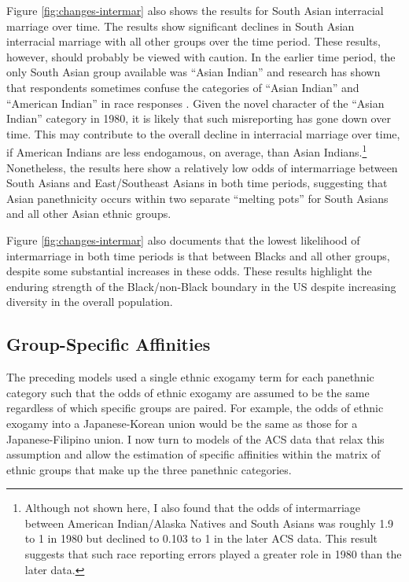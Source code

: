 \documentclass[11pt,]{article}
\begin{document}
Figure \ref{fig:changes-intermar} also shows the results for South Asian interracial marriage over time. The results show significant declines in South Asian interracial marriage with all other groups over the time period. These results, however, should probably be viewed with caution. In the earlier time period, the only South Asian group available was ``Asian Indian'' and research has shown that respondents sometimes confuse the categories of ``Asian Indian'' and ``American Indian'' in race responses \citep{liebler_american_2004}. Given the novel character of the ``Asian Indian'' category in 1980, it is likely that such misreporting has gone down over time. This may contribute to the overall decline in interracial marriage over time, if American Indians are less endogamous, on average, than Asian Indians.\footnote{Although not shown here, I also found that the odds of intermarriage between American Indian/Alaska Natives and South Asians was roughly 1.9 to 1 in 1980 but declined to 0.103 to 1 in the later ACS data. This result suggests that such race reporting errors played a greater role in 1980 than the later data.} Nonetheless, the results here show a relatively low odds of intermarriage between South Asians and East/Southeast Asians in both time periods, suggesting that Asian panethnicity occurs within two separate ``melting pots'' for South Asians and all other Asian ethnic groups.

Figure \ref{fig:changes-intermar} also documents that the lowest likelihood of intermarriage in both time periods is that between Blacks and all other groups, despite some substantial increases in these odds. These results highlight the enduring strength of the Black/non-Black boundary in the US despite increasing diversity in the overall population.

\hypertarget{group-specific-affinities}{%
\subsection{Group-Specific Affinities}\label{group-specific-affinities}}

The preceding models used a single ethnic exogamy term for each panethnic category such that the odds of ethnic exogamy are assumed to be the same regardless of which specific groups are paired. For example, the odds of ethnic exogamy into a Japanese-Korean union would be the same as those for a Japanese-Filipino union. I now turn to models of the ACS data that relax this assumption and allow the estimation of specific affinities within the matrix of ethnic groups that make up the three panethnic categories.
\end{document}
